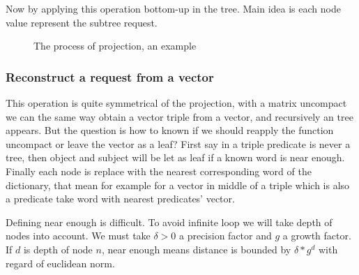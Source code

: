Now by applying this operation bottom-up in the tree. Main idea is each node value represent the subtree request.

\begin{figure}
\begin{center}
\caption{The process of projection, an example}
\end{center}
\end{figure}

\subsubsection{Reconstruct a request from a vector}

This operation is quite symmetrical of the projection, with a matrix uncompact we can the same way obtain a vector triple from a vector, and recursively an tree appears. But the question is how to known if we should reapply the function uncompact or leave the vector as a leaf? First say in a triple predicate is never a tree, then object and subject will be let as leaf if a known word is near enough. Finally each node is replace with the nearest corresponding word of the dictionary, that mean for example for a vector in middle of a triple which is also a predicate take word with nearest predicates' vector.

Defining near enough is difficult. To avoid infinite loop we will take depth of nodes into account. We must take $\delta>0$ a precision factor and $g$ a growth factor. If $d$ is depth of node $n$, near enough means distance is bounded by $\delta*g^d$ with regard of euclidean norm.  

